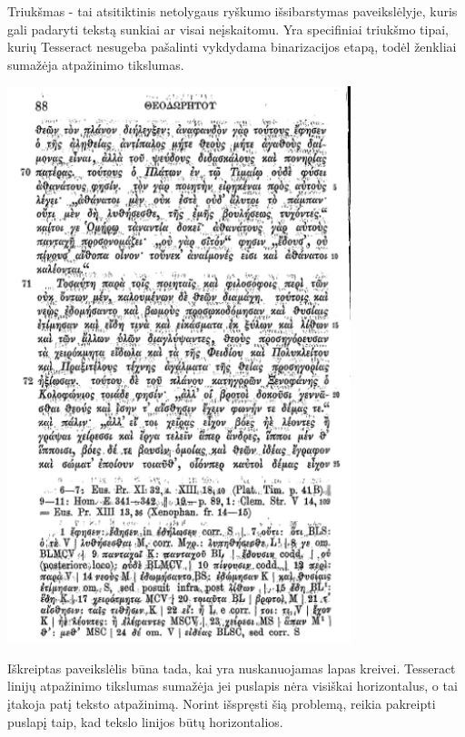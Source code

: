 \documentclass{VUMIFInfBakalaurinis}
\begin{document}
Triukšmas - tai atsitiktinis netolygaus ryškumo išsibarstymas paveikslėlyje, kuris gali padaryti tekstą sunkiai ar visai neįskaitomu.
Yra specifiniai triukšmo tipai, kurių Tesseract nesugeba pašalinti vykdydama binarizacijos etapą, todėl ženkliai sumažėja atpažinimo tikslumas.

\begin{minipage}{\linewidth}
  \centering
  \includegraphics[width=10cm]{noise.png}
  \label{noise}
\end{minipage}

Iškreiptas paveikslėlis būna tada, kai yra nuskanuojamas lapas kreivei. Tesseract linijų atpažinimo tikslumas sumažėja jei puslapis nėra visiškai horizontalus, o
tai įtakoja patį teksto atpažinimą. Norint išspręsti šią problemą, reikia pakreipti puslapį taip, kad tekslo linijos būtų horizontalios.
\end{document}
